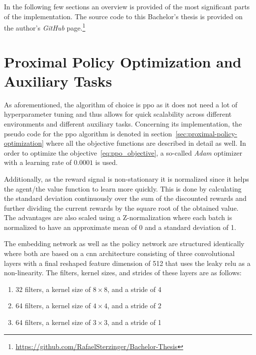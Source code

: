 \documentclass[draft,final]{vutinfth} %
\begin{document}
    In the following few sections an overview is provided of the most significant parts of the implementation.
    The source code to this Bachelor's thesis is provided on the author's \textit{GitHub} page.\footnote{\url{https://github.com/RafaelSterzinger/Bachelor-Thesis}}


    \section{Proximal Policy Optimization and Auxiliary Tasks}\label{sec:proximal-policy-optimization-and-auxiliary-tasks}

    As aforementioned, the algorithm of choice is \gls{ppo} as it does not need a lot of hyperparameter tuning and thus allows for quick scalability across different environments and different auxiliary tasks.
    Concerning its implementation, the pseudo code for the \gls{ppo} algorithm is denoted in section~\ref{sec:proximal-policy-optimization} where all the objective functions are described in detail as well.
    In order to optimize the objective~\ref{eq:ppo_objective}, a so-called \textit{Adam} optimizer with a learning rate of $0.0001$ is used.

    Additionally, as the reward signal is non-stationary it is normalized since it helps the agent/the value function to learn more quickly.
    This is done by calculating the standard deviation continuously over the sum of the discounted rewards and further dividing the current rewards by the square root of the obtained value.
    The advantages are also scaled using a Z-normalization where each batch is normalized to have an approximate mean of 0 and a standard deviation of 1.

    The embedding network as well as the policy network are structured identically where both are based on a \gls{cnn} architecture consisting of three convolutional layers with a final reshaped feature dimension of 512 that uses the leaky \gls{relu} as a non-linearity.
    The filters, kernel sizes, and strides of these layers are as follows:

    \begin{enumerate}
        \item 32 filters, a kernel size of $8 \times 8$, and a stride of 4
        \item 64 filters, a kernel size of $4 \times 4$, and a stride of 2
        \item 64 filters, a kernel size of $3 \times 3$, and a stride of 1
    \end{enumerate}
\end{document}
